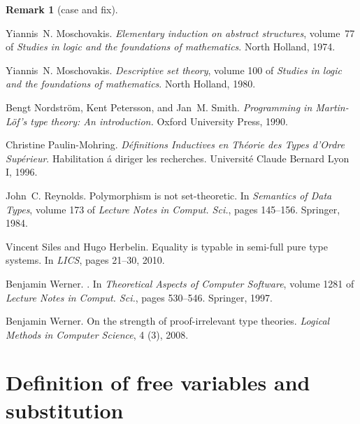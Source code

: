\documentclass{LMCS}
\theoremstyle{plain}
\theoremstyle{definition}
\newtheorem{remm}[thm]{Remark}
\begin{document}
\begin{remm}[\textsf{case} and \textsf{fix}]
\begin{thebibliography}{[10]}
Yiannis~N. Moschovakis.
\newblock \emph{Elementary induction on abstract structures}, volume~77 of
  \emph{Studies in logic and the foundations of mathematics}.
\newblock North Holland, 1974.

Yiannis~N. Moschovakis.
\newblock \emph{Descriptive set theory}, volume 100 of \emph{Studies in logic
  and the foundations of mathematics}.
\newblock North Holland, 1980.

Bengt Nordstr\"om, Kent Petersson, and Jan~M. Smith.
\newblock \emph{{Programming in Martin-L\"of's type theory: An introduction.}}
\newblock Oxford University Press, 1990.

Christine Paulin-Mohring.
\newblock \emph{D\'{e}finitions {I}nductives en {T}h\'{e}orie des {T}ypes
  d'{O}rdre {S}up\'{e}rieur}.
\newblock Habilitation \'{a} diriger les recherches. Universit\'{e} Claude
  Bernard Lyon I, 1996.

John~C. Reynolds.
\newblock Polymorphism is not set-theoretic.
\newblock In \emph{Semantics of Data Types}, volume 173 of \emph{Lecture Notes
  in Comput. Sci.}, pages 145--156. Springer, 1984.

Vincent Siles and Hugo Herbelin.
\newblock Equality is typable in semi-full pure type systems.
\newblock In \emph{LICS}, pages 21--30, 2010.

Benjamin Werner.
.
\newblock In \emph{Theoretical Aspects of Computer Software}, volume 1281 of
  \emph{Lecture Notes in Comput. Sci.}, pages 530--546. Springer, 1997.

Benjamin Werner.
\newblock On the strength of proof-irrelevant type theories.
\newblock \emph{Logical Methods in Computer Science}, 4 (3), 2008.

\end{thebibliography}






\appendix
\section{Definition of free variables and substitution}\label{A-defi}


\end{remm}
\end{document}
